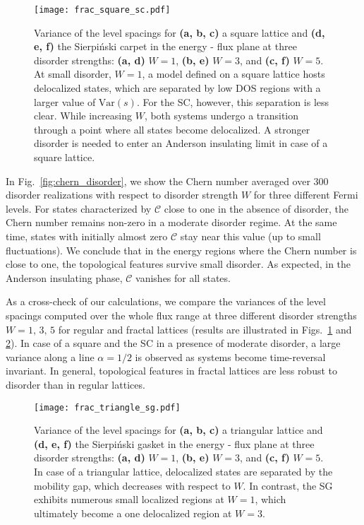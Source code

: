 \begin{figure}[H]
\centering
\texttt{[image: frac\_square\_sc.pdf]}
\caption[Variance of the level spacings for a square lattice and the Sierpiński carpet at different disorder strengths]{Variance of the level spacings for \textbf{(a, b, c)} a square lattice and \textbf{(d, e, f)} the Sierpiński carpet in the energy - flux plane at three disorder strengths: \textbf{(a, d)} $W = 1$,  \textbf{(b, e)} $W = 3$, and \textbf{(c, f)} $W = 5$. At small disorder, $W = 1$, a model defined on a square lattice hosts delocalized states, which are separated by low DOS regions with a larger value of $\mathrm{Var} (s)$. For the SC, however, this separation is less clear. While increasing $W$, both systems undergo a transition through a point where all states become delocalized. A stronger disorder is needed to enter an Anderson insulating limit in case of a square lattice.}
\label{fig:var_SC_square}
\end{figure}

In Fig.~\ref{fig:chern_disorder}, we show the Chern number averaged over $300$ disorder realizations with respect to disorder strength $W$ for three different Fermi levels. For states characterized by $\mathcal{C}$ close to one in the absence of disorder, the Chern number remains non-zero in a moderate disorder regime. At the same time, states with initially almost zero $\mathcal{C}$ stay near this value (up to small fluctuations). We conclude that in the energy regions where the Chern number is close to one, the topological features survive small disorder. As expected, in the Anderson insulating phase, $\mathcal{C}$ vanishes for all states.

As a cross-check of our calculations, we compare the variances of the level spacings computed over the whole flux range at three different disorder strengths $W = 1, \, 3, \, 5$ for regular and fractal lattices (results are illustrated in Figs.~\ref{fig:var_SC_square} and \ref{fig:var_SG_triangle}). In case of a square and the SC in a presence of moderate disorder, a large variance along a line $\alpha = 1/2$ is observed as systems become time-reversal invariant. In general, topological features in fractal lattices are less robust to disorder than in regular lattices.

\begin{figure}[H]
\centering
\texttt{[image: frac\_triangle\_sg.pdf]}
\caption[Variance of the level spacing for a triangular lattice and the Sierpiński gasket at different disorder strengths]{Variance of the level spacings for \textbf{(a, b, c)} a triangular lattice and \textbf{(d, e, f)} the Sierpiński gasket in the energy - flux plane at three disorder strengths: \textbf{(a, d)} $W = 1$,  \textbf{(b, e)} $W = 3$, and \textbf{(c, f)} $W = 5$. In case of a triangular lattice, delocalized states are separated by the mobility gap, which decreases with respect to $W$. In contrast, the SG exhibits numerous small localized regions at $W =1$, which ultimately become a one delocalized region at $W =3$.}
\label{fig:var_SG_triangle}
\end{figure}